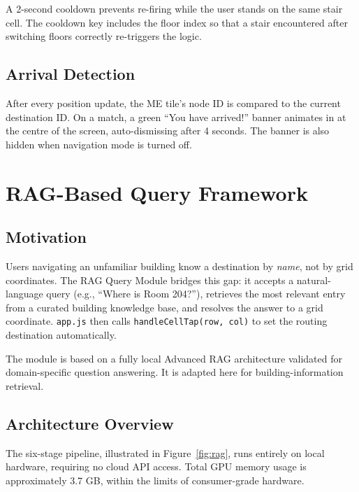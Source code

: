 \documentclass[12pt,a4paper]{article}
\begin{document}
A 2-second cooldown prevents re-firing while the user stands on the same stair
cell. The cooldown key includes the floor index so that a stair encountered
after switching floors correctly re-triggers the logic.

\subsection{Arrival Detection}

After every position update, the ME tile's node ID is compared to the current
destination ID. On a match, a green ``You have arrived!'' banner animates in at
the centre of the screen, auto-dismissing after 4 seconds. The banner is also
hidden when navigation mode is turned off.

\section{RAG-Based Query Framework}
\label{sec:rag}

\subsection{Motivation}

Users navigating an unfamiliar building know a destination by \emph{name}, not
by grid coordinates. The RAG Query Module bridges this gap: it accepts a
natural-language query (e.g., ``Where is Room 204?''), retrieves the most
relevant entry from a curated building knowledge base, and resolves the answer
to a grid coordinate. \texttt{app.js} then calls \texttt{handleCellTap(row,
col)} to set the routing destination automatically.

The module is based on a fully local Advanced RAG architecture validated for
domain-specific question answering. It is adapted here for building-information
retrieval.

\subsection{Architecture Overview}

The six-stage pipeline, illustrated in Figure~\ref{fig:rag}, runs entirely on
local hardware, requiring no cloud API access. Total GPU memory usage is
approximately 3.7 GB, within the limits of consumer-grade hardware.
\end{document}

